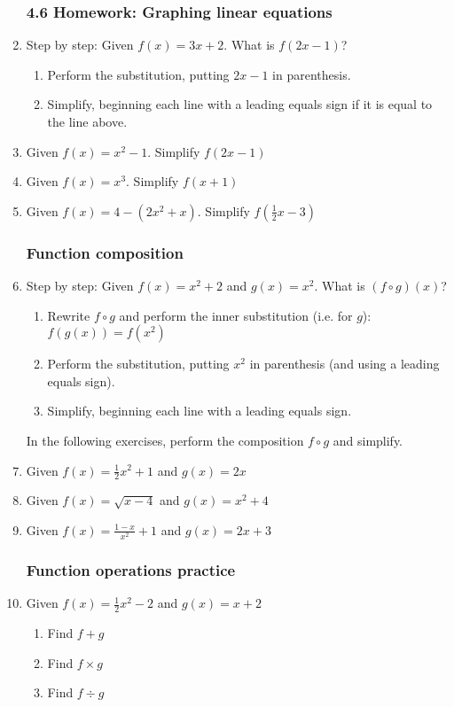 \documentclass[12pt, twoside]{article}
\begin{document}
\begin{enumerate}
\subsubsection*{4.6 Homework: Graphing linear equations}
  \item Step by step: Given $f(x)=3x+2$. What is $f(2x-1)$?
    \begin{enumerate}
        \item Perform the substitution, putting $2x-1$ in parenthesis.
        \item Simplify, beginning each line with a leading equals sign if it is equal to the line above.
    \end{enumerate}
  \item Given $f(x)=x^2-1$. Simplify $f(2x-1)$
  \item Given $f(x)=x^3$. Simplify $f(x+1)$
  \item Given $f(x)=4-(2x^2+x)$. Simplify $f(\frac{1}{2}x-3)$

  \subsubsection*{Function composition}
  \item Step by step: Given $f(x)=x^2+2$ and $g(x)=x^2$. What is $(f \circ g)(x)$?
  \begin{enumerate}
      \item Rewrite $f \circ g$ and perform the inner substitution (i.e. for $g$): $f(g(x))=f(x^2)$
      \item Perform the substitution, putting $x^2$ in parenthesis (and using a leading equals sign).
      \item Simplify, beginning each line with a leading equals sign.
  \end{enumerate}
  In the following exercises, perform the composition $f \circ g$ and simplify.
  \item Given $f(x)=\frac{1}{2}x^2+1$ and $g(x)=2x$
  \item Given $f(x)=\sqrt{x-4}$ and $g(x)=x^2+4$
  \item Given $\displaystyle f(x)=\frac{1-x}{x^2}+1$ and $g(x)=2x+3$

  \subsubsection*{Function operations practice}
  \item Given $f(x)=\frac{1}{2}x^2-2$ and $g(x)=x+2$
  \begin{enumerate}
      \item Find $f + g$
      \item Find $f \times g$
      \item Find $f \div g$
  \end{enumerate}


\end{enumerate}
\end{document}
